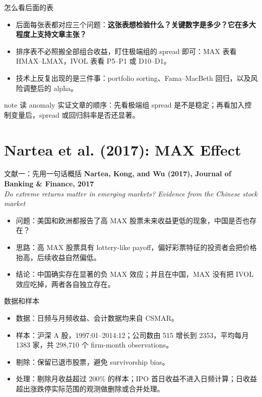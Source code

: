 \documentclass[aspectratio=169,10pt]{beamer}
\newcommand{\papermax}{Nartea, Kong, and Wu (2017)}
\newcommand{\tabnote}[1]{\vspace{2pt}{\scriptsize\textcolor{gray!70!black}{#1}}}
\begin{document}
\begin{frame}{怎么看后面的表}
	\begin{itemize}
		\item 后面每张表都对应三个问题：\textbf{这张表想检验什么？关键数字是多少？它在多大程度上支持文章主张？}
		\item 排序表不必照搬全部组合收益，盯住极端组的 spread 即可：MAX 表看 HMAX--LMAX，IVOL 表看 P5--P1 或 D10--D1。
		\item 技术上反复出现的是三件事：portfolio sorting、Fama--MacBeth 回归，以及风险调整后的 alpha。
	\end{itemize}
	\vspace{4pt}
	\begin{beamercolorbox}[sep=0.45em,wd=\linewidth,rounded=true]{note}
		读 anomaly 实证文章的顺序：先看极端组 spread 是不是稳定；再看加入控制变量后，spread 或回归斜率是否还显著。
	\end{beamercolorbox}
\end{frame}

\section{Nartea et al. (2017): MAX Effect}

\begin{frame}{文献一：先用一句话概括}
	\textbf{\papermax, Journal of Banking \& Finance, 2017}\\
	\textit{Do extreme returns matter in emerging markets? Evidence from the Chinese stock market}
	\vspace{6pt}
	\begin{itemize}
		\item 问题：美国和欧洲都报告了高 MAX 股票未来收益更低的现象，中国是否也存在？
		\item 思路：高 MAX 股票具有 lottery-like payoff，偏好彩票特征的投资者会把价格抬高，后续收益自然偏低。
		\item 结论：中国确实存在显著的负 MAX 效应；并且在中国，MAX 没有把 IVOL 效应吃掉，两者各自独立存在。
	\end{itemize}
\end{frame}

\begin{frame}{数据和样本}
	\begin{itemize}
		\item 数据：日频与月频收益、会计数据均来自 CSMAR。
		\item 样本：沪深 A 股，1997:01--2014:12；公司数由 515 增长到 2353，平均每月 1383 家，共 298{,}710 个 firm-month observations。
		\item 剔除：保留已退市股票，避免 survivorship bias。
		\item 处理：剔除月收益超过 200\% 的样本；IPO 首日收益不进入日频计算；日收益超出涨跌停实际范围的观测做删除或合并处理。
	\end{itemize}
	\tabnote{这些处理基本都是围绕涨跌停制度展开的，否则 MAX 会被价格限制机械截断，识别不出真正的极端收益。}
\end{frame}
\end{document}
